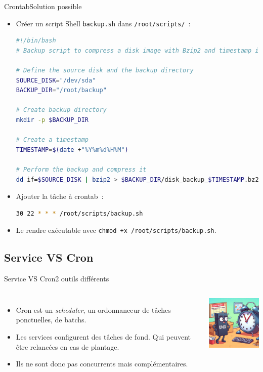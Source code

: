 \documentclass{beamer}
\begin{document}
    \begin{frame}[fragile]{Crontab}{Solution possible}
        \begin{itemize}
            \item Créer un script Shell \lstinline{backup.sh} dans \lstinline{/root/scripts/}~:
            \begin{lstlisting}[language=bash]
#!/bin/bash
# Backup script to compress a disk image with Bzip2 and timestamp it

# Define the source disk and the backup directory
SOURCE_DISK="/dev/sda"
BACKUP_DIR="/root/backup"

# Create backup directory
mkdir -p $BACKUP_DIR

# Create a timestamp
TIMESTAMP=$(date +"%Y%m%d%H%M")

# Perform the backup and compress it
dd if=$SOURCE_DISK | bzip2 > $BACKUP_DIR/disk_backup_$TIMESTAMP.bz2
            \end{lstlisting}
            \item Ajouter la tâche à crontab~:
            \begin{lstlisting}[language=bash]
30 22 * * * /root/scripts/backup.sh
            \end{lstlisting}
            \item Le rendre exécutable avec \lstinline{chmod +x /root/scripts/backup.sh}.
        \end{itemize}
    \end{frame}

    \subsection{Service VS Cron}\label{subsec:service-vs-cron}

    \begin{frame}{Service VS Cron}{2 outils différents}
        \begin{columns}
            \begin{itemize}
                \item Cron est un \textit{scheduler}, un ordonnanceur de tâches ponctuelles, de batchs.
                \item Les services configurent des tâches de fond.
                Qui peuvent être relancées en cas de plantage.
                \item Ils ne sont donc pas concurrents mais complémentaires.
            \end{itemize}
            \includegraphics[width=4cm]{image/cron-scheduled-proc}
        \end{columns}
    \end{frame}
\end{document}

